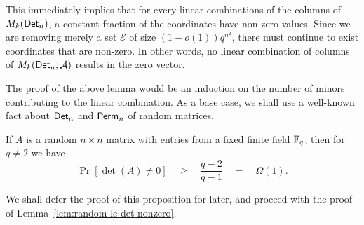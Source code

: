 This immediately implies that for every linear combinations of the columns of $M_k(\mathsf{Det}_n)$, a constant fraction of the coordinates have non-zero values. Since we are removing merely a set $\mathcal{E}$ of size $(1-o(1))q^{n^2}$, there must continue to exist coordinates that are non-zero. In other words, no linear combination of columns of $M_k(\mathsf{Det}_n;\mathcal{A})$ results in the zero vector. 


The proof of the above lemma would be an induction on the number of minors contributing to the linear combination. As a base case, we shall use a well-known fact about $\mathsf{Det}_n$ and $\mathsf{Perm}_n$ of random matrices. 

\begin{proposition}\label{prop:random-det-nonzero}
  If $A$ is a random $n\times n$ matrix with entries from a fixed
  finite field $\mathbb{F}_q$, then for $q\neq 2$ we have
$$
\Pr[\det(A) \neq 0] \quad\geq\quad \frac{q-2}{q-1} \quad=\quad\Omega(1).
$$
\end{proposition}

We shall defer the proof of this proposition for later, and proceed with the proof of Lemma~\ref{lem:random-lc-det-nonzero}. 

